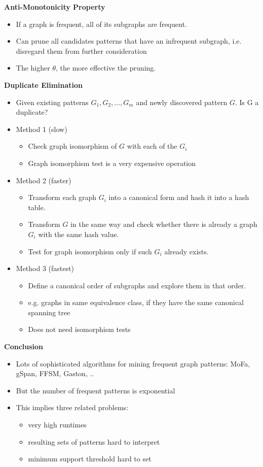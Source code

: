 \documentclass[../notes.tex]{subfiles}
\begin{document}
\textbf{Anti-Monotonicity Property}
\begin{itemize}
  \item If a graph is frequent, all of its subgraphs are frequent.
  \item Can prune all candidates patterns that have an infrequent subgraph, i.e. disregard them from further consideration
  \item The higher $\theta$, the more effective the pruning.
\end{itemize}

\textbf{Duplicate Elimination}
\begin{itemize}
  \item Given existing patterns $G_1, G_2, ..., G_m$ and newly discovered pattern $G$. Is G a duplicate?
  \item Method 1 (slow)
  \begin{itemize}
    \item Check graph isomorphism of $G$ with each of the $G_i$
    \item Graph isomorphism test is a very expensive operation
  \end{itemize}

  \item Method 2 (faster)
  \begin{itemize}
    \item Transform each graph $G_i$ into a canonical form and hash it into a hash table.
    \item Transform $G$ in the same way and check whether there is already a graph $G_i$ with the same hash value.
    \item Test for graph isomorphism only if such $G_i$ already exists.
  \end{itemize}

  \item Method 3 (fastest)
  \begin{itemize}
    \item Define a canonical order of subgraphs and explore them in that order.
    \item e.g. graphs in same equivalence class, if they have the same canonical spanning tree
    \item Does not need isomorphism tests
  \end{itemize}
\end{itemize}

\textbf{Conclusion}
\begin{itemize}
  \item Lots of sophisticated algorithms for mining frequent graph patterns: MoFa, gSpan, FFSM, Gaston, ..
  \item But the number of frequent patterns is exponential
  \item This implies three related problems:
  \begin{itemize}
    \item very high runtimes
    \item resulting sets of patterns hard to interpret
    \item minimum support threshold hard to set
  \end{itemize}
\end{itemize}
\end{document}

